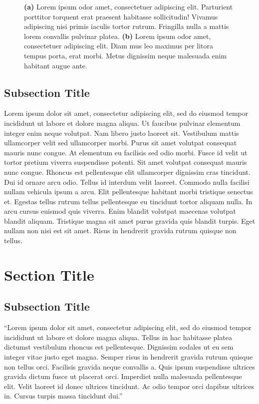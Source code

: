 \documentclass[10pt,letterpaper,twocolumn]{article}
\begin{document}
\begin{figure}[!ht]
\begin{subfigure}[t]{0.5\textwidth}
    \captionsetup{width=.8\linewidth}
    \caption[Science]{}
    \label{fig:wi}
  \end{subfigure}
  \caption{\textbf{(a)} Lorem ipsum odor amet, consectetuer adipiscing elit. Parturient porttitor torquent erat praesent habitasse sollicitudin! Vivamus adipiscing nisi primis iaculis tortor rutrum. Fringilla nulla a mattis lorem convallis pulvinar platea.  \textbf{(b)} Lorem ipsum odor amet, consectetuer adipiscing elit. Diam mus leo maximus per litora tempus porta, erat morbi. Metus dignissim neque malesuada enim habitant augue ante.}
\end{figure}

\subsection{Subsection Title}

Lorem ipsum dolor sit amet, consectetur adipiscing elit, sed do eiusmod tempor incididunt ut labore et dolore magna aliqua. Ut faucibus pulvinar elementum integer enim neque volutpat. Nam libero justo laoreet sit. Vestibulum mattis ullamcorper velit sed ullamcorper morbi. Purus sit amet volutpat consequat mauris nunc congue. At elementum eu facilisis sed odio morbi. Fusce id velit ut tortor pretium viverra suspendisse potenti. Sit amet volutpat consequat mauris nunc congue. Rhoncus est pellentesque elit ullamcorper dignissim cras tincidunt. Dui id ornare arcu odio. Tellus id interdum velit laoreet. Commodo nulla facilisi nullam vehicula ipsum a arcu. Elit pellentesque habitant morbi tristique senectus et. Egestas tellus rutrum tellus pellentesque eu tincidunt tortor aliquam nulla. In arcu cursus euismod quis viverra. Enim blandit volutpat maecenas volutpat blandit aliquam. Tristique magna sit amet purus gravida quis blandit turpis. Eget nullam non nisi est sit amet. Risus in hendrerit gravida rutrum quisque non tellus.\autocite[Lorem ipsum...][]{book-two}

\section{Section Title}
\setcounter{equation}{0}

\subsection{Subsection Title}

``Lorem ipsum dolor sit amet, consectetur adipiscing elit, sed do eiusmod tempor incididunt ut labore et dolore magna aliqua. Tellus in hac habitasse platea dictumst vestibulum rhoncus est pellentesque. Dignissim sodales ut eu sem integer vitae justo eget magna. Semper risus in hendrerit gravida rutrum quisque non tellus orci. Facilisis gravida neque convallis a. Quis ipsum suspendisse ultrices gravida dictum fusce ut placerat orci. Imperdiet nulla malesuada pellentesque elit. Velit laoreet id donec ultrices tincidunt. Ac odio tempor orci dapibus ultrices in. Cursus turpis massa tincidunt dui.''\Autocite[1]{book-one}
\end{document}
